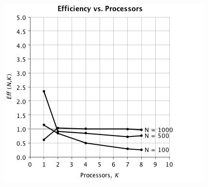 \documentclass{dependencies/acm_proc_article-sp}
\begin{document}
\begin{center}
\includegraphics[scale=0.5]{images/parallel/eff-vs-proc.png}
\end{center}
\end{document}

